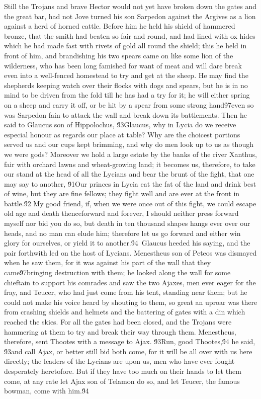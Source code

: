 {Still the Trojans and brave Hector would not yet have broken down the gates and the great bar, had not Jove turned his son Sarpedon against the Argives as a lion against a herd of horned cattle. Before him he held his shield of hammered bronze, that the smith had beaten so fair and round, and had lined with ox hides which he had made fast with rivets of gold all round the shield; this he held in front of him, and brandishing his two spears came on like some lion of the wilderness, who has been long famished for want of meat and will dare break even into a well-fenced homestead to try and get at the sheep. He may find the shepherds keeping watch over their flocks with dogs and spears, but he is in no mind to be driven from the fold till he has had a try for it; he will either spring on a sheep and carry it off, or be hit by a spear from some strong hand\'97even so was Sarpedon fain to attack the wall and break down its battlements. Then he said to Glaucus son of Hippolochus, \'93Glaucus, why in Lycia do we receive especial honour as regards our place at table? Why are the choicest portions served us and our cups kept brimming, and why do men look up to us as though we were gods? Moreover we hold a large estate by the banks of the river Xanthus, fair with orchard lawns and wheat-growing land; it becomes us, therefore, to take our stand at the head of all the Lycians and bear the brunt of the fight, that one may say to another, \'91Our princes in Lycia eat the fat of the land and drink best of wine, but they are fine fellows; they fight well and are ever at the front in battle.\'92 My good friend, if, when we were once out of this fight, we could escape old age and death thenceforward and forever, I should neither press forward myself nor bid you do so, but death in ten thousand shapes hangs ever over our heads, and no man can elude him; therefore let us go forward and either win glory for ourselves, or yield it to another.\'94\
Glaucus heeded his saying, and the pair forthwith led on the host of Lycians. Menestheus son of Peteos was dismayed when he saw them, for it was against his part of the wall that they came\'97bringing destruction with them; he looked along the wall for some chieftain to support his comrades and saw the two Ajaxes, men ever eager for the fray, and Teucer, who had just come from his tent, standing near them; but he could not make his voice heard by shouting to them, so great an uproar was there from crashing shields and helmets and the battering of gates with a din which reached the skies. For all the gates had been closed, and the Trojans were hammering at them to try and break their way through them. Menestheus, therefore, sent Thootes with a message to Ajax. \'93Run, good Thootes,\'94 he said, \'93and call Ajax, or better still bid both come, for it will be all over with us here directly; the leaders of the Lycians are upon us, men who have ever fought desperately heretofore. But if they have too much on their hands to let them come, at any rate let Ajax son of Telamon do so, and let Teucer, the famous bowman, come with him.\'94\
}
